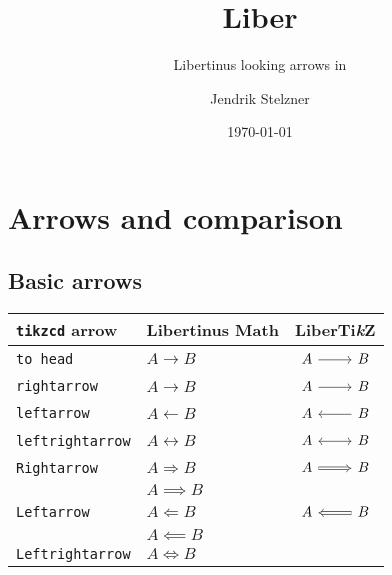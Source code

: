 \documentclass{scrartcl}
\title{Liber\tikzlogo{}}
\subtitle{Libertinus looking arrows in \tikzlogo{}}
\author{Jendrik Stelzner}
\date{\today}
\newcommand{\tikzlogo}{Ti\textit{\textrm{k}}Z}
\newcommand{\tablehead}{\textbf}
\newcommand{\tipname}{\texttt}
\begin{document}
\maketitle





\section{Arrows and comparison}


\subsection{Basic arrows}

\begin{longtable}{l@{\qquad}l@{\qquad}l}
	\toprule
	\tablehead{\texttt{tikzcd} arrow}
	&
	\tablehead{Libertinus Math}
	&
	\tablehead{Liber\tikzlogo{}}
	\\
	\midrule
	\tipname{to head}
	&
	$A \longrightarrow B$
	&
	$\begin{tikzcd} A \arrow[to head]{r} & B \end{tikzcd}$
	\\
	\tipname{rightarrow}
	&
	$A \longrightarrow B$
	&
	$\begin{tikzcd} A \arrow[rightarrow]{r} & B \end{tikzcd}$
	\\
	\tipname{leftarrow}
	&
	$A \longleftarrow B$
	&
	$\begin{tikzcd} A \arrow[leftarrow]{r} & B \end{tikzcd}$
	\\
	\tipname{leftrightarrow}
	&
	$A \longleftrightarrow B$
	&
	$\begin{tikzcd} A \arrow[leftrightarrow]{r} & B \end{tikzcd}$
	\\
	\tipname{Rightarrow}
	&
	$A \Rightarrow B$
	&
	$\begin{tikzcd} A \arrow[Rightarrow]{r} & B \end{tikzcd}$
	\\
	{}
	&
	$A \implies B$
	&
	{}
	\\
	\tipname{Leftarrow}
	&
	$A \Leftarrow B$
	&
	$\begin{tikzcd} A \arrow[Leftarrow]{r} & B \end{tikzcd}$
	\\
	{}
	&
	$A \impliedby B$
	&
	{}
	\\
	\tipname{Leftrightarrow}
	&
	$A \Leftrightarrow B$

\end{longtable}
\end{document}
